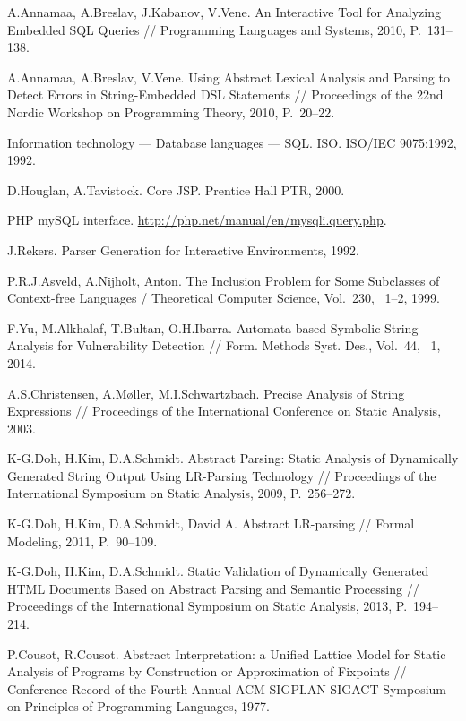 \begin{thebibliography}{99}
  A.Annamaa, A.Breslav, J.Kabanov, V.Vene.
  An Interactive Tool for Analyzing Embedded SQL Queries //
  Programming Languages and Systems, 2010, P.~131--138.

  A.Annamaa, A.Breslav, V.Vene.
  Using Abstract Lexical Analysis and Parsing to Detect Errors in String-Embedded DSL Statements //
  Proceedings of the 22nd Nordic Workshop on Programming Theory, 2010, P.~20--22.

  Information technology --- Database languages --- SQL. ISO. ISO/IEC 9075:1992, 1992.

  D.Houglan, A.Tavistock. Core JSP. Prentice Hall PTR, 2000.

  PHP mySQL interface. \url{http://php.net/manual/en/mysqli.query.php}.

  J.Rekers. Parser Generation for Interactive Environments, 1992.

  P.R.J.Asveld, A.Nijholt, Anton.
  The Inclusion Problem for Some Subclasses of Context-free Languages /
  Theoretical Computer Science, Vol.~230, \textnumero~1--2, 1999.

 F.Yu, M.Alkhalaf, T.Bultan, O.H.Ibarra.
 Automata-based Symbolic String Analysis for Vulnerability Detection //
 Form. Methods Syst. Des., Vol.~44, \textnumero~1, 2014.

 A.S.Christensen, A.M{\o}ller, M.I.Schwartzbach.
 Precise Analysis of String Expressions //
 Proceedings of the International Conference on Static Analysis, 2003.

 K-G.Doh, H.Kim, D.A.Schmidt.
 Abstract Parsing: Static Analysis of Dynamically Generated String Output Using LR-Parsing Technology //
 Proceedings of the International Symposium on Static Analysis, 2009, P.~256--272.

 K-G.Doh, H.Kim, D.A.Schmidt, David A.
 Abstract LR-parsing // Formal Modeling, 2011, P.~90--109.

 K-G.Doh, H.Kim, D.A.Schmidt.
 Static Validation of Dynamically Generated HTML Documents Based on Abstract Parsing and Semantic Processing //
 Proceedings of the International Symposium on Static Analysis, 2013, P.~194--214.

 P.Cousot, R.Cousot.
 Abstract Interpretation: a Unified Lattice Model for Static Analysis of Programs by Construction 
 or Approximation of Fixpoints // Conference Record of the Fourth Annual ACM SIGPLAN-SIGACT Symposium on Principles of Programming Languages,
 1977.


\end{thebibliography}
